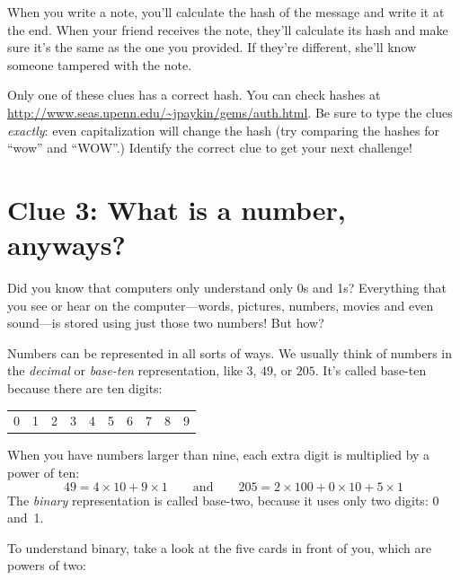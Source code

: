 \documentclass{article}
\begin{document}
When you write a note, you'll calculate the hash of the message and write it at the end. When your friend receives the note, they'll calculate its hash and make sure it's the same as the one you provided. If they're different, she'll know someone tampered with the note.

Only one of these clues has a correct hash. You can check hashes at \url{http://www.seas.upenn.edu/~jpaykin/gems/auth.html}. Be sure to type the clues \textit{exactly}: even capitalization will change the hash (try comparing the hashes for ``wow'' and ``WOW''.) Identify the correct clue to get your next challenge!


\newpage

\section*{Clue 3: What is a number, anyways?}

Did you know that computers only understand only 0s and 1s? Everything that you
see or hear on the computer---words, pictures, numbers, movies and even sound---is
stored using just those two numbers! But how? 

Numbers can be represented in all sorts of ways. We usually think of numbers in
the \emph{decimal} or \emph{base-ten} representation, like $3$, $49$, or $205$.
It's called base-ten because there are ten digits:
\begin{center}\begin{tabular}{cccccccccc}
    0 & 1 & 2 & 3 & 4 & 5 & 6 & 7 & 8 & 9
\end{tabular}\end{center}
When you have numbers larger than nine, each extra digit is multiplied by a
power of ten:
\[
    49 = 4\times10 + 9\times1 \qquad\textrm{and}\qquad 
    205 = 2\times100 + 0\times10 + 5\times1
\]
The \emph{binary} representation is called base-two, because it uses only
two digits: 0 and~1. 

To understand binary, take a look at the five cards in front of you, which are
powers of two:
\end{document}
